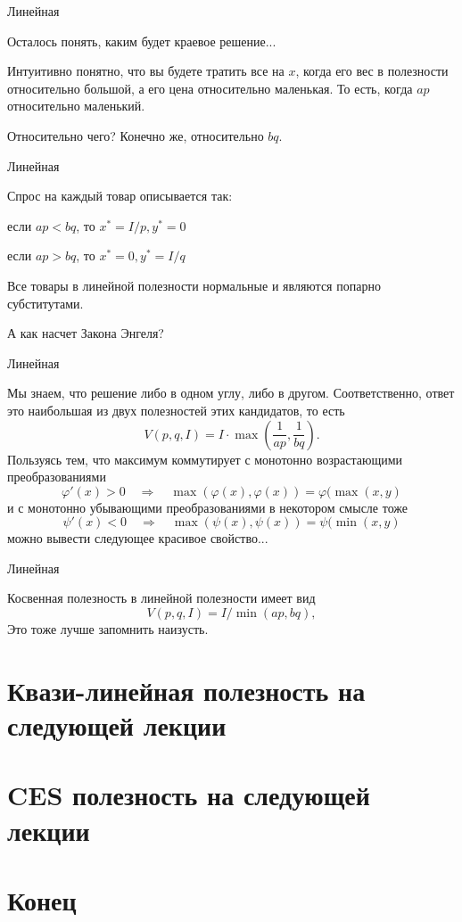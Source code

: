 \documentclass{beamer}
\begin{document}
\begin{frame}{Линейная}

Осталось понять, каким будет краевое решение...

Интуитивно понятно, что вы будете тратить все на $x$, когда его вес в полезности относительно большой, а его цена относительно маленькая. То есть, когда $ap$ относительно маленький. 

Относительно чего? Конечно же, относительно $bq$.

\end{frame}

\begin{frame}{Линейная}

Спрос на каждый товар описывается так: 

если $ap < bq$, то $x^{\ast} = I/p, y^{\ast} = 0$

если $ap > bq$, то $x^{\ast} = 0, y^{\ast} = I/q$

Все товары в линейной полезности нормальные и являются попарно субститутами.

А как насчет Закона Энгеля?

\end{frame}

\begin{frame}{Линейная}

Мы знаем, что решение либо в одном углу, либо в другом. Соответственно, ответ это наибольшая из двух полезностей этих кандидатов, то есть
$$V(p,q,I) = I \cdot \max(\frac{1}{ap}, \frac{1}{bq}).$$
Пользуясь тем, что максимум коммутирует с монотонно возрастающими преобразованиями
$$ \varphi'(x) >0 \quad \Rightarrow \quad \max(\varphi(x), \varphi(x)) = \varphi(\max(x, y)$$
и с монотонно убывающими преобразованиями в некотором смысле тоже
$$ \psi'(x) < 0 \quad \Rightarrow \quad \max(\psi(x), \psi(x)) = \psi(\min(x, y)$$
можно вывести следующее красивое свойство...

\end{frame}

\begin{frame}{Линейная}

Косвенная полезность в линейной полезности имеет вид
$$V(p,q,I) = I / \min(ap, bq),$$
Это тоже лучше запомнить наизусть.
\end{frame}

\section{Квази-линейная полезность на следующей лекции}
\section{CES полезность на следующей лекции}

\section{Конец}
\end{document}
